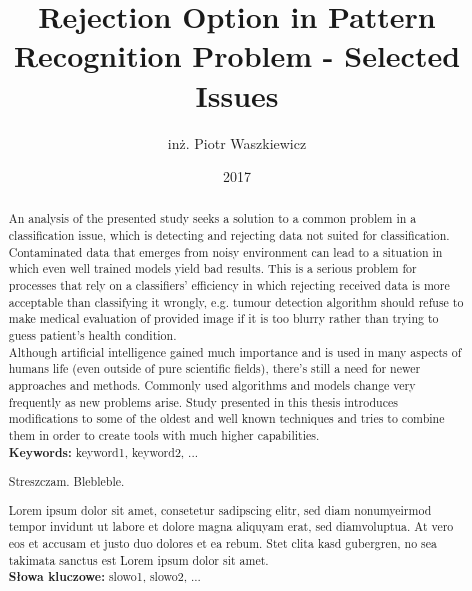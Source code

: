 \documentclass[en]{minipw} %
\title{Rejection Option in Pattern Recognition Problem - Selected Issues} %
\author{inż. Piotr Waszkiewicz}
\date{2017}
\begin{document}
\sloppy
	
	

	
	
	
	
\setcounter{page}{1}
	
{
	\begin{abstract}
			
		An analysis of the presented study seeks a solution to a common problem in a classification issue, which is detecting and rejecting data not suited for classification. Contaminated data that emerges from noisy environment can lead to a situation in which even well trained models yield bad results. This is a serious problem for processes that rely on a classifiers' efficiency in which rejecting received data is more acceptable than classifying it wrongly, e.g. tumour detection algorithm should refuse to make medical evaluation of provided image if it is too blurry rather than trying to guess patient's health condition. \\
			
		Although artificial intelligence gained much importance and is used in many aspects of humans life (even outside of pure scientific fields), there's still a need for newer approaches and methods. Commonly used algorithms and models change very frequently as new problems arise. Study presented in this thesis introduces modifications to some of the oldest and well known techniques and tries to combine them in order to create tools with much higher capabilities. \\
		
		\noindent \textbf{Keywords:} keyword1, keyword2, ...
\end{abstract}}

\begin{abstract}
	
	Streszczam. Blebleble.
	
	Lorem ipsum dolor sit amet, consetetur sadipscing elitr, sed diam nonumyeirmod tempor invidunt ut labore et dolore magna aliquyam erat, sed diamvoluptua. At vero eos et accusam et justo duo dolores et ea rebum. Stet clita kasd gubergren, no sea takimata sanctus est Lorem ipsum dolor sit amet.\\
	
	\noindent \textbf{Słowa kluczowe:} slowo1, slowo2, ...
\end{abstract}
	
\end{document}

